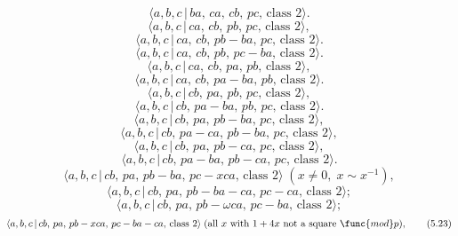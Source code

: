 \documentclass[10pt]{article}
\begin{document}
\begin{equation}
\langle a,b,c\,|\,ba,\,ca,\,cb,\,pc,\,\text{class }2\rangle .  \tag{5.8}
\end{equation}
\begin{equation}
\langle a,b,c\,|\,ca,\,cb,\,pb,\,pc,\,\text{class }2\rangle ,  \tag{5.9}
\end{equation}%
\begin{equation}
\langle a,b,c\,|\,ca,\,cb,\,pb-ba,\,pc,\,\text{class }2\rangle .  \tag{5.10}
\end{equation}
\begin{equation}
\langle a,b,c\,|\,ca,\,cb,\,pb,\,pc-ba,\,\text{class }2\rangle .  \tag{5.11}
\end{equation}
\begin{equation}
\langle a,b,c\,|\,ca,\,cb,\,pa,\,pb,\,\text{class }2\rangle ,  \tag{5.12}
\end{equation}%
\begin{equation}
\langle a,b,c\,|\,ca,\,cb,\,pa-ba,\,pb,\,\text{class }2\rangle .  \tag{5.13}
\end{equation}%
\begin{equation}
\langle a,b,c\,|\,cb,\,pa,\,pb,\,pc,\,\text{class }2\rangle ,  \tag{5.14}
\end{equation}%
\begin{equation}
\langle a,b,c\,|\,cb,\,pa-ba,\,pb,\,pc,\,\text{class }2\rangle .  \tag{5.15}
\end{equation}
\begin{equation}
\langle a,b,c\,|\,cb,\,pa,\,pb-ba,\,pc,\,\text{class }2\rangle ,  \tag{5.16}
\end{equation}%
\begin{equation}
\langle a,b,c\,|\,cb,\,pa-ca,\,pb-ba,\,pc,\,\text{class }2\rangle , 
\tag{5.17}
\end{equation}%
\begin{equation}
\langle a,b,c\,|\,cb,\,pa,\,pb-ca,\,pc,\,\text{class }2\rangle ,  \tag{5.18}
\end{equation}%
\begin{equation}
\langle a,b,c\,|\,cb,\,pa-ba,\,pb-ca,\,pc,\,\text{class }2\rangle . 
\tag{5.19}
\end{equation}%
\begin{equation}
\langle a,b,c\,|\,cb,\,pa,\,pb-ba,\,pc-xca,\,\text{class }2\rangle \;(x\neq
0,\;x\sim x^{-1}),  \tag{5.20}
\end{equation}%
\begin{equation}
\langle a,b,c\,|\,cb,\,pa,\,pb-ba-ca,\,pc-ca,\,\text{class }2\rangle ; 
\tag{5.21}
\end{equation}%
\begin{equation}
\langle a,b,c\,|\,cb,\,pa,\,pb-\omega ca,\,pc-ba,\,\text{class }2\rangle ; 
\tag{5.22}
\end{equation}%
\begin{equation}
\langle a,b,c\,|\,cb,\,pa,\,pb-xca,\,pc-ba-ca,\,\text{class }2\rangle \;(%
\text{all }x\text{ with }1+4x\text{ not a square }\func{mod}p),  \tag{5.23}
\end{equation}
\end{document}
